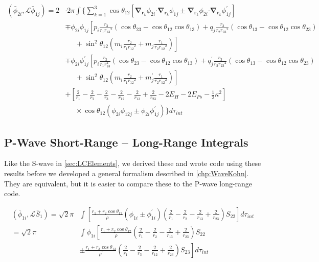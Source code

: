 \documentclass[Dissertation.tex]{subfiles}
\begin{document}
\begin{align}
\label{eq:PWavePhi2Phi1}
\left(\bar{\phi}_{2i},\mathcal{L} \bar{\phi}_{1j}\right) = 2 & \cdot 2\pi \int \Bigg\{ \sum_{k=1}^3 \cos\theta_{12} \left[ \boldsymbol{\nabla}_{\!\mathbf{r}_k} \nonumber \phi_{2i} \boldsymbol{\cdot} \boldsymbol{\nabla}_{\!\mathbf{r}_k} \phi_{1j} \pm \boldsymbol{\nabla}_{\!\mathbf{r}_k} \phi_{2i} \boldsymbol{\cdot} \boldsymbol{\nabla}_{\!\mathbf{r}_k} \phi_{1j}^\prime \right] \\
 \nonumber &\mp \phi_{2i} \phi_{1j} \left[p_i \frac{r_3}{r_1 {r_{13}}^2} (\cos\theta_{23} - \cos\theta_{12} \cos\theta_{13}) + q_j \frac{r_3}{r_2 {r_{23}}^2}(\cos\theta_{13}-\cos\theta_{12} \cos\theta_{23})\right.\\
 \nonumber & \left. \;\;\;\;\;  + \sin^2\theta_{12} \left(m_i \frac{r_2}{r_1 {r_{12}}^2} + m_j \frac{r_1}{r_2 {r_{12}}^2} \right) \right] \\
 \nonumber &\mp \phi_{2i} \phi_{1j}^\prime \left[p_i \frac{r_3}{r_1 r_{13}^2} (\cos\theta_{23} - \cos\theta_{12} \cos\theta_{13}) + q_j^\prime \frac{r_3}{r_2 {r_{23}}^2}(\cos\theta_{13}-\cos\theta_{12} \cos\theta_{23})\right.\\
 \nonumber & \left. \;\;\;\;\;  + \sin^2\theta_{12} \left(m_i \frac{r_2}{r_1 {r_{12}}^2} + m_j^\prime \frac{r_1}{r_2 {r_{12}}^2} \right) \right] \\
 \nonumber &+ \left. \left[\frac{2}{r_1} - \frac{2}{r_2} - \frac{2}{r_3} - \frac{2}{r_{12}} - \frac{2}{r_{13}} + \frac{2}{r_{23}} - 2 E_H - 2 E_{Ps} - \frac{1}{2}\kappa^2 \right] \right. \\
 &\;\;\;\;\; \times \cos\theta_{12} \left(\phi_{2i} \phi_{12j} \pm \phi_{2i} \phi_{1j}^\prime \right) \Bigg\} d\tau_{int}
\end{align}


\subsection{P-Wave Short-Range -- Long-Range Integrals}
\label{sec:PWaveShortLong}

Like the S-wave in \cref{sec:LCElements}, we derived these and wrote code using these results before we developed a general formalism described in \cref{chp:WaveKohn}. They are equivalent, but it is easier to compare these to the P-wave long-range code.

\begin{align}
\label{eq:PWavePhi1SBar}
\nonumber \left(\bar{\phi}_{1i},\mathcal{L} \bar{S}_1\right) = \sqrt{2} \pi & \int \left[ \frac{r_1 + r_2 \cos\theta_{12}}{\rho} \left(\phi_{1i} \pm \phi_{1i}^\prime \right) \left(\frac{2}{r_1} - \frac{2}{r_2} - \frac{2}{r_{13}} + \frac{2}{r_{23}} \right) S_{22} \right] d\tau_{int} \\
\nonumber = \sqrt{2} \pi & \int \phi_{1i} \left[ \frac{r_1 + r_2 \cos\theta_{12}}{\rho} \left( \frac{2}{r_1} - \frac{2}{r_2} - \frac{2}{r_{13}} + \frac{2}{r_{23}} \right) S_{22} \right. \\
& \pm \left. \frac{r_1 + r_3 \cos\theta_{13}}{\rho^\prime} \left( \frac{2}{r_1} - \frac{2}{r_3} - \frac{2}{r_{12}} + \frac{2}{r_{23}} \right) S_{23} \right]  d\tau_{int}
\end{align}
\end{document}
